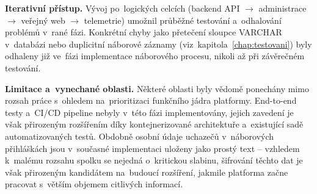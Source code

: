 \textbf{Iterativní přístup.} Vývoj po~logických celcích (backend API $\rightarrow$ administrace $\rightarrow$ veřejný web $\rightarrow$ telemetrie) umožnil průběžné testování a~odhalování problémů v~rané fázi. Konkrétní chyby jako přetečení sloupce VARCHAR v~databázi nebo duplicitní náborové záznamy (viz~kapitola~\ref{chap:testovani}) byly odhaleny již ve~fázi implementace náborového procesu, nikoli až při závěrečném testování.

\textbf{Limitace a~vynechané oblasti.} Některé oblasti byly vědomě ponechány mimo rozsah práce s~ohledem na~prioritizaci funkčního jádra platformy. End-to-end testy a~CI/CD pipeline nebyly v~této fázi implementovány, jejich zavedení je však přirozeným rozšířením díky kontejnerizované architektuře a~existující sadě automatizovaných testů. Obdobně osobní údaje uchazečů v~náborových přihláškách jsou v~současné implementaci uloženy jako prostý text -- vzhledem k~malému rozsahu spolku se nejedná o~kritickou slabinu, šifrování těchto dat je však přirozeným kandidátem na~budoucí rozšíření, jakmile platforma začne pracovat s~větším objemem citlivých informací.
